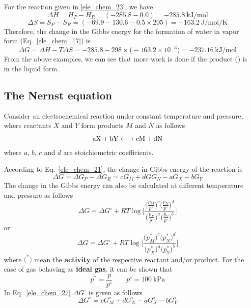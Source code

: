 \documentclass[11pt,a4paper]{article}
\numberwithin{equation}{section}
\theoremstyle{it}
\theoremstyle{definition}
\begin{document}
For the reaction given in \ref{ele_chem_23}, we have
\begin{equation*}
	\Delta H = H_P-H_R = (-285.8-0.0)=\SI{-285.8}{\kilo\joule\per\mole}
\end{equation*}
\begin{equation*}
	\Delta S = S_P-S_R = (-69.9-130.6-0.5\times205)=\SI{-163.2}{\joule\per\mole\per\kelvin}
\end{equation*}
Therefore, the change in the Gibbs energy for the formation of water in vapor form (Eq.~\eqref{ele_chem_17}) is
\begin{equation*}
	\Delta G = \Delta H -T\Delta S = -285.8-298\times\Big(-163.2\times10^{-3}\Big)=\SI{-237.16}{\kilo\joule\per\mole}
\end{equation*}
From the above examples, we can see that more work is done if the product () is in the liquid form.

\subsection{The Nernst equation}
Consider an electrochemical reaction under constant temperature and pressure, where reactants $X$ and $Y$ form products $M$ and $N$ as follows
\begin{equation}\label{ele_chem_24}
	\ce{aX + bY <-> cM + dN}
\end{equation}
where $a$, $b$, $c$ and $d$ are stoichiometric coefficients.

According to Eq.~\eqref{ele_chem_21}, the change in Gibbs energy of the reaction is 
\begin{equation}\label{ele_chem_25}
	\Delta G = \Delta G_P - \Delta G_R= cG_M+dGG_N-aG_X-bG_Y
\end{equation}
The change in the Gibbs energy can also be calculated at different temperature and pressure as follows
\begin{equation}\label{ele_chem_26}
	\Delta G = \Delta G^\circ + RT\log{\Bigg[\frac{\Big(\frac{p_M}{p^\circ}\Big)^c\Big(\frac{p_N}{p^\circ}\Big)^d}{\Big(\frac{p_X}{p^\circ}\Big)^a\Big(\frac{p_Y}{p^\circ}\Big)^b}\Bigg]}
\end{equation}
or 
\begin{equation}\label{ele_chem_27}
	\Delta G = \Delta G^\circ + RT\log{\Bigg[\frac{\Big({p_M^*}\Big)^c\Big({p_N^*}\Big)^d}{\Big({p_X^*}\Big)^a\Big({p_Y^*}\Big)^b}\Bigg]}
\end{equation}
where $\Big(^*\Big)$ mean the \textbf{activity} of the respective reactant and/or product. For the case of gas behaving as \textbf{ideal gas}, it can be shown that 
\begin{equation}\label{ele_chem_28}
	p^*=\frac{p}{p^\circ}\qquad p^\circ=\SI{100}{\kilo\pascal}
\end{equation}
In Eq.~\eqref{ele_chem_27} $\Delta G^\circ$ is given as follows
\begin{equation}\label{ele_chem_29}
	\Delta G^\circ = cG_M^\circ+dG_N^\circ-aG_X^\circ-bG_Y^\circ
\end{equation}
\end{document}
